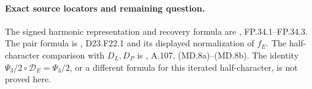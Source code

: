 \paragraph{Exact source locators and remaining question.}
The signed harmonic representation and recovery formula are
,
FP.34.1--FP.34.3. The pair formula is
,
D23.F22.1 and its displayed normalization of $f_E$.
The half-character comparison with $D_L,D_P$ is
, A.107,
(MD.8a)--(MD.8b).
The identity $\Psi_3/2\circ\mathcal D_E=\Psi_3/2$, or a different
formula for this iterated half-character, is not proved here.
